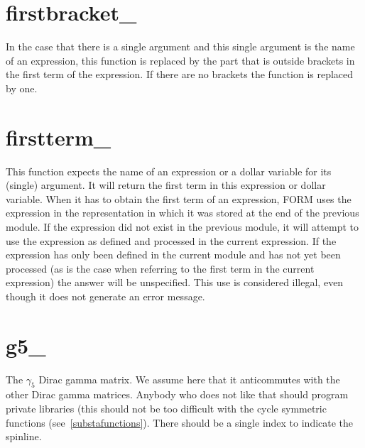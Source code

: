 
\section{firstbracket\_}
\label{funfirstbracket}
\noindent In the case that there is a single argument and this 
single argument is the name of an expression, this function is replaced by 
the part that is outside brackets in the first term of the expression. If 
there are no brackets the function is replaced by one.


\section{firstterm\_}
\label{funfirstterm}

\noindent This function expects the name of an expression or a dollar 
variable for its (single) argument. It will return the first term in this 
expression or dollar variable. When it has to obtain the first term of an 
expression, FORM uses the expression in the representation in which it was 
stored at the end of the previous module. If the expression did not exist 
in the previous module, it will attempt to use the expression as defined 
and processed in the current expression. If the expression has only been 
defined in the current module and has not yet been processed (as is the 
case when referring to the first term in the current expression) the answer 
will be unspecified. This use is considered illegal, even though it does 
not generate an error message.


\section{g5\_}
\label{fungfive}
\noindent The $\gamma_5$ Dirac gamma matrix. We assume here that it 
anticommutes with the other Dirac gamma 
matrices. Anybody who does not like that should program private libraries 
(this should not be too difficult with the cycle symmetric functions 
(see~\ref{substafunctions}). There should be a single index to indicate 
the spinline.


